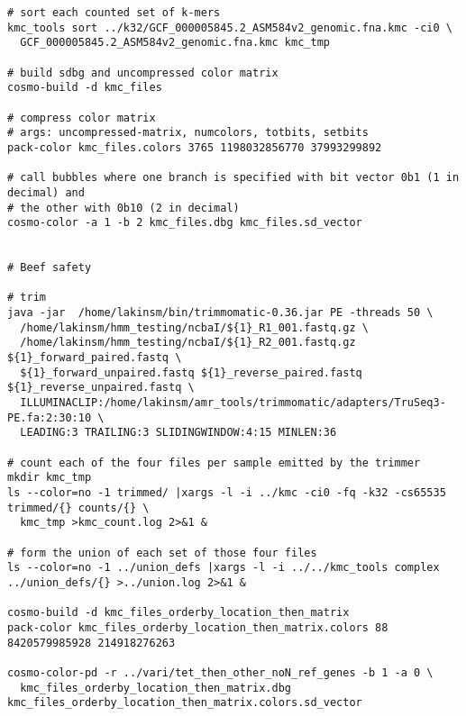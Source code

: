 \documentclass{article}
\begin{document}
\begin{verbatim}
# sort each counted set of k-mers
kmc_tools sort ../k32/GCF_000005845.2_ASM584v2_genomic.fna.kmc -ci0 \
  GCF_000005845.2_ASM584v2_genomic.fna.kmc kmc_tmp

# build sdbg and uncompressed color matrix
cosmo-build -d kmc_files

# compress color matrix
# args: uncompressed-matrix, numcolors, totbits, setbits
pack-color kmc_files.colors 3765 1198032856770 37993299892 

# call bubbles where one branch is specified with bit vector 0b1 (1 in decimal) and 
# the other with 0b10 (2 in decimal)
cosmo-color -a 1 -b 2 kmc_files.dbg kmc_files.sd_vector


# Beef safety

# trim
java -jar  /home/lakinsm/bin/trimmomatic-0.36.jar PE -threads 50 \
  /home/lakinsm/hmm_testing/ncbaI/${1}_R1_001.fastq.gz \
  /home/lakinsm/hmm_testing/ncbaI/${1}_R2_001.fastq.gz ${1}_forward_paired.fastq \
  ${1}_forward_unpaired.fastq ${1}_reverse_paired.fastq ${1}_reverse_unpaired.fastq \
  ILLUMINACLIP:/home/lakinsm/amr_tools/trimmomatic/adapters/TruSeq3-PE.fa:2:30:10 \
  LEADING:3 TRAILING:3 SLIDINGWINDOW:4:15 MINLEN:36

# count each of the four files per sample emitted by the trimmer
mkdir kmc_tmp
ls --color=no -1 trimmed/ |xargs -l -i ../kmc -ci0 -fq -k32 -cs65535 trimmed/{} counts/{} \
  kmc_tmp >kmc_count.log 2>&1 &

# form the union of each set of those four files
ls --color=no -1 ../union_defs |xargs -l -i ../../kmc_tools complex ../union_defs/{} >../union.log 2>&1 &

cosmo-build -d kmc_files_orderby_location_then_matrix
pack-color kmc_files_orderby_location_then_matrix.colors 88 8420579985928 214918276263

cosmo-color-pd -r ../vari/tet_then_other_noN_ref_genes -b 1 -a 0 \
  kmc_files_orderby_location_then_matrix.dbg kmc_files_orderby_location_then_matrix.colors.sd_vector
\end{verbatim}



\end{document}
